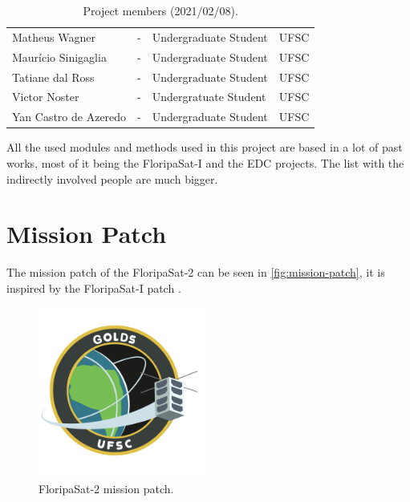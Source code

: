 \begin{table}[ht]
\begin{tabular}{lllc}
        Matheus Wagner                      & -         & Undergraduate Student & UFSC \\
        Maurício Sinigaglia                 & -         & Undergraduate Student & UFSC \\
        Tatiane dal Ross                    & -         & Undergraduate Student & UFSC \\
        Victor Noster                       & -         & Undergratuate Student & UFSC \\
        Yan Castro de Azeredo               & -         & Undergraduate Student & UFSC \\
        \bottomrule[1.5pt]
    \end{tabular}
    \caption{Project members (2021/02/08).}
    \label{tab:team-members}
\end{table}

All the used modules and methods used in this project are based in a lot of past works, most of it being the FloripaSat-I and the EDC projects. The list with the indirectly involved people are much bigger.

\section{Mission Patch}

The mission patch of the FloripaSat-2 can be seen in \autoref{fig:mission-patch}, it is inspired by the FloripaSat-I patch \cite{floripasat}.

\begin{figure}[!ht]
    \begin{center}
        \includegraphics[width=0.5\textwidth]{figures/golds-ufsc-patch.png}
        \caption{FloripaSat-2 mission patch.}
        \label{fig:mission-patch}
    \end{center}
\end{figure}
